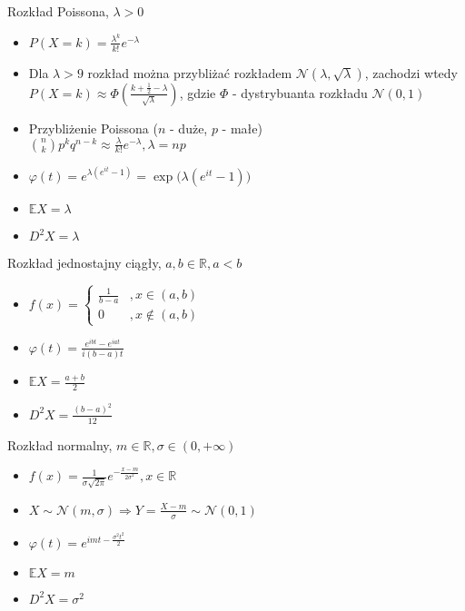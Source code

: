 \documentclass[a4paper,12pt]{report}
\theoremstyle{break}
\theoremstyle{definition}
\theoremstyle{defi}
\theoremstyle{break}
\theoremstyle{defi}
\begin{document}
\newpage
{\Large Rozkład Poissona, $ \lambda>0 $}
\begin{itemize}
\item $ P(X=k)=\frac{\lambda^k}{k!}e^{-\lambda} $
\item Dla $ \lambda>9 $ rozkład można przybliżać rozkładem $ \mathcal N\left(\lambda,\sqrt{\lambda}\right) $, zachodzi wtedy\\
$ P(X=k)\approx
\Phi\left(\frac{k+\frac{1}{2}-\lambda}{\sqrt{\lambda}}\right) $,
gdzie $ \Phi $ - dystrybuanta rozkładu $ \mathcal N(0,1) $
\item Przybliżenie Poissona ($ n $ - duże, $ p $ - małe)\\
$ {n\choose k }p^kq^{n-k}\approx\frac{\lambda}{k!}e^{-\lambda},\lambda=np$
\item $ \varphi(t)=e^{\lambda(e^{it}-1)}=\exp\bigl(\lambda(e^{it}-1)\bigr) $
\item $ \mathbb{E}X=\lambda $
\item $ D^2X=\lambda $
\end{itemize}
{\Large Rozkład jednostajny ciągły, $ a,b\in \mathbb R ,a<b $}
\begin{multicols}{2}
\begin{itemize}
\item $ f(x)=\left \{
\begin{array}{ll}
\frac{1}{b-a}&,x\in(a,b)\\
0&,x\notin(a,b)
\end{array}
\right . $
\item $ \varphi(t)=\frac{e^{ibt}-e^{iat}}{i(b-a)t} $
\item $ \mathbb{E}X=\frac{a+b}{2} $
\item $ D^2X=\frac{\left(b-a\right)^2}{12} $
\end{itemize}
\end{multicols}
{\Large Rozkład normalny, $ m\in \mathbb R ,\sigma\in \left(0,+\infty \right) $}
\begin{multicols}{2}
\begin{itemize}
\item $ f(x)=\frac{1}{\sigma\sqrt{2\pi}}e^{-\frac{x-m}{2\sigma^2}} ,x\in \mathbb R $
\item $ X\sim\mathcal N(m,\sigma)\Rightarrow Y=\frac{X-m}{\sigma}\sim \mathcal N(0,1) $
\item $ \varphi(t)=e^{imt-\frac{\sigma^2t^2}{2}} $
\item $ \mathbb{E}X=m $
\item $ D^2X=\sigma^2 $
\end{itemize}
\end{multicols}
\end{document}
